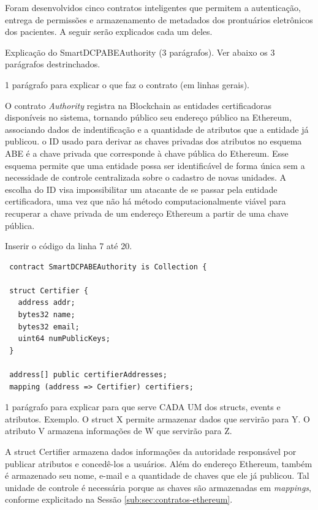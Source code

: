 \documentclass[a4paper,11pt]{article}
\begin{document}
Foram desenvolvidos cinco contratos inteligentes que permitem a autenticação, entrega de permissões e armazenamento de metadados dos prontuários eletrônicos dos pacientes. A seguir serão explicados cada um deles.

{\color{ForestGreen} Explicação do  SmartDCPABEAuthority (3 parágrafos). Ver abaixo os 3 parágrafos destrinchados.}

{\color{Magenta} 1 parágrafo para explicar o que faz o contrato (em linhas gerais).}

O contrato \emph{Authority} registra na Blockchain as entidades certificadoras disponíveis no sistema, tornando público seu endereço público na Ethereum, associando dados de indentificação e a quantidade de atributos que a entidade já publicou.
o ID usado para derivar as chaves privadas dos atributos no esquema ABE é a chave privada que corresponde à chave pública do Ethereum.
Esse esquema permite que uma entidade possa ser identificável de forma única sem a necessidade de controle centralizada sobre o cadastro de novas unidades.
A escolha do ID visa impossibilitar um atacante de se passar pela entidade certificadora, uma vez que não há método computacionalmente viável para recuperar a chave privada de um endereço Ethereum a partir de uma chave pública.

{\color{Magenta} Inserir o código da linha 7 até 20.}

\begin{lstlisting}
 contract SmartDCPABEAuthority is Collection {

 struct Certifier {
   address addr;
   bytes32 name;
   bytes32 email;
   uint64 numPublicKeys;
 }

 address[] public certifierAddresses;
 mapping (address => Certifier) certifiers;
\end{lstlisting}

{\color{Magenta} 1 parágrafo para explicar para que serve CADA UM dos structs, events e atributos. Exemplo. O struct X permite armazenar dados que servirão para Y. O atributo V armazena informações de W que servirão para Z.}

A struct Certifier armazena dados informações da autoridade responsável por publicar atributos e concedê-los a usuários. Além do endereço Ethereum, também é armazenado seu nome, e-mail e a quantidade de chaves que ele já publicou.
Tal unidade de controle é necessária porque as chaves são armazenadas em \emph{mappings}, conforme explicitado na Sessão \ref{sub:sec:contratos-ethereum}.
\end{document}
